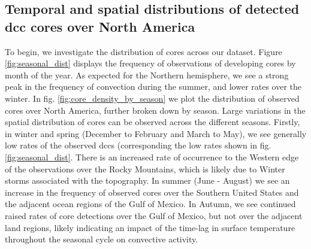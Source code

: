 


\subsection{Temporal and spatial distributions of detected \acrshort{dcc} cores over North America}


To begin, we investigate the distribution of cores across our dataset.
Figure \ref{fig:seasonal_dist} displays the frequency of observations of developing cores by month of the year.
As expected for the Northern hemisphere, we see a strong peak in the frequency of convection during the summer, and lower rates over the winter.
In fig. \ref{fig:core_density_by_season} we plot the distribution of observed cores over North America, further broken down by season.
Large variations in the spatial distribution of cores can be observed across the different seasons.
Firstly, in winter and spring (December to February and March to May), we see generally low rates of the observed \acrshort{dcc}s (corresponding the low rates shown in fig. \ref{fig:seasonal_dist}.
There is an increased rate of occurrence to the Western edge of the observations over the Rocky Mountains, which is likely due to Winter storms associated with the topography.
In summer (June - August) we see an increase in the frequency of observed cores over the Southern United States and the adjacent ocean regions of the Gulf of Mexico.
In Autumn, we see continued raised rates of core detections over the Gulf of Mexico, but not over the adjacent land regions, likely indicating an impact of the time-lag in surface temperature throughout the seasonal cycle on convective activity.

